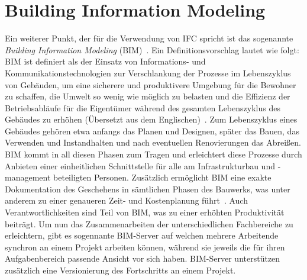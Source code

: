 \section{Building Information Modeling}\label{basics:bim}
Ein weiterer Punkt, der für die Verwendung von IFC spricht ist das sogenannte \textit{Building Information Modeling} (BIM)~\cite{Building41:online}.
Ein Definitionsvorschlag lautet wie folgt: \glqq{}BIM ist definiert als der Einsatz von Informations- und Kommunikationstechnologien zur Verschlankung der Prozesse im Lebenszyklus von Gebäuden, um eine sicherere und produktivere Umgebung für die Bewohner zu schaffen, die Umwelt so wenig wie möglich zu belasten und die Effizienz der Betriebsabläufe für die Eigentümer während des gesamten Lebenszyklus des Gebäudes zu erhöhen\grqq{} (Übersetzt aus dem Englischen)~\cite{Arayici2010}.
Zum Lebenszyklus eines Gebäudes gehören etwa anfangs das Planen und Designen, später das Bauen, das Verwenden und Instandhalten und nach eventuellen Renovierungen das Abreißen.
BIM kommt in all diesen Phasen zum Tragen und erleichtert diese Prozesse durch Anbieten einer einheitlichen Schnittstelle für alle am Infrastrukturbau und -management beteiligten Personen.
Zusätzlich ermöglicht BIM eine exakte Dokumentation des Geschehens in sämtlichen Phasen des Bauwerks, was unter anderem zu einer genaueren Zeit- und Kostenplanung führt~\cite{Ding2014}.
Auch Verantwortlichkeiten sind Teil von BIM, was zu einer erhöhten Produktivität beiträgt.
Um nun das Zusammenarbeiten der unterschiedlichen Fachbereiche zu erleichtern, gibt es sogennante BIM-Server auf welchen mehrere Arbeitende synchron an einem Projekt arbeiten können, während sie jeweils die für ihren Aufgabenbereich passende Ansicht vor sich haben.
BIM-Server unterstützen zusätzlich eine Versionierung des Fortschritts an einem Projekt.

